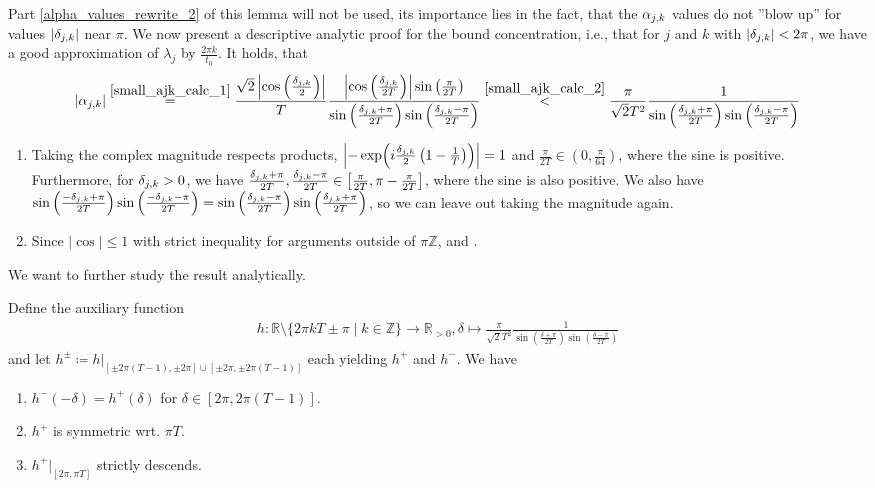 Part \ref{alpha_values_rewrite_2} of this lemma will not be used, its importance lies in the fact, that the \(\alpha_{j, k}\) values do not ''blow up'' for values \(|\delta_{j, k}|\) near \(\pi\). We now present a descriptive analytic proof for the bound concentration, i.e., that for \(j\) and \(k\) with \(|\delta_{j, k}| < 2\pi\), we have a good approximation of \(\lambda_j\) by \(\frac{2 \pi k}{t_0}\). It holds, that
\begin{align}
    |\alpha_{j, k}| \overset{\ref{small_ajk_calc_1}}{=} \frac{\sqrt{2}\left|\cos\left(\frac{\delta_{j, k}}{2}\right)\right|}{T} \frac{\left|\cos\left(\frac{\delta_{j, k}}{2T}\right)\right|\sin\left(\frac{\pi}{2T}\right)}{\sin\left(\frac{\delta_{j, k}+\pi}{2T}\right)\sin\left(\frac{\delta_{j, k}-\pi}{2T}\right)} \overset{\ref{small_ajk_calc_2}}{<} \frac{\pi}{\sqrt{2}T^2} \frac{1}{\sin\left(\frac{\delta_{j, k}+\pi}{2T}\right)\sin\left(\frac{\delta_{j, k}-\pi}{2T}\right)} \label{first_alpha_magnitude_rewrite}
\end{align}
\begin{enumerate}[label=(\arabic*), wide]
    \item \label{small_ajk_calc_1} Taking the complex magnitude respects products, \(\left|-\exp(i\frac{\delta_{j, k}}{2}\left(1-\frac{1}{T}\right))\right| = 1\) and  \(\frac{\pi}{2T} \in \left(0, \frac{\pi}{64}\right)\), where the sine is positive. Furthermore, for \(\delta_{j, k} > 0\), we have \(\frac{\delta_{j, k}+\pi}{2T}, \frac{\delta_{j, k}-\pi}{2T} \in \left[\frac{\pi}{2T}, \pi - \frac{\pi}{2T}\right]\), where the sine is also positive. We also have \(\sin\left(\frac{-\delta_{j, k}+\pi}{2T}\right)\sin\left(\frac{-\delta_{j, k}-\pi}{2T}\right) = \sin\left(\frac{\delta_{j, k}-\pi}{2T}\right)\sin\left(\frac{\delta_{j, k}+\pi}{2T}\right)\), so we can leave out taking the magnitude again.
    \item \label{small_ajk_calc_2} Since \(|\cos| \leq 1\) with strict inequality for arguments outside of \(\pi \mathbb{Z}\), and .
\end{enumerate}

We want to further study the result analytically.

\begin{lemma} \label{continuous_delta_alpha_behavior}
    Define the auxiliary function
    \begin{align}
        h\colon \mathbb{R} \setminus \{2 \pi k T \pm \pi \mid k \in \mathbb{Z}\} \to \mathbb{R}_{> 0}, \delta \mapsto \frac{\pi}{\sqrt{2}T^2} \frac{1}{\sin\left(\frac{\delta+\pi}{2T}\right)\sin\left(\frac{\delta-\pi}{2T}\right)}
    \end{align}
    and let \(h^\pm \coloneqq h|_{[\pm2\pi(T-1), \pm2\pi] \cup [\pm2\pi, \pm2\pi(T-1)]}\) each yielding \(h^+\) and \(h^-\). We have
    \begin{enumerate}[label=(\roman*)]
        \item \(h^-(-\delta) = h^+(\delta)\) for \(\delta \in [2\pi, 2\pi(T-1)]\).
        \item \(h^+\) is symmetric wrt. \(\pi T\).
        \item \(h^+|_{[2\pi, \pi T]}\) strictly descends.
    \end{enumerate}
\end{lemma}

